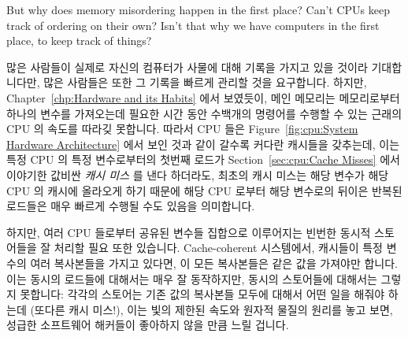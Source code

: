 But why does memory misordering happen in the first place?
Can't CPUs keep track of ordering on their own?
Isn't that why we have computers in the first place, to keep track of things?
\fi

많은 사람들이 실제로 자신의 컴퓨터가 사물에 대해 기록을 가지고 있을 것이라
기대합니다만, 많은 사람들은 또한 그 기록을 빠르게 관리할 것을 요구합니다.
하지만, Chapter~\ref{chp:Hardware and its Habits} 에서 보였듯이, 메인 메모리는
메모리로부터 하나의 변수를 가져오는데 필요한 시간 동안 수백개의 명령어를 수행할
수 있는 근래의 CPU 의 속도를 따라깆 못합니다.
따라서 CPU 들은
Figure~\ref{fig:cpu:System Hardware Architecture} 에서 보인 것과 같이
갈수록 커다란 캐시들을 갖추는데, 이는 특정 CPU 의 특정 변수로부터의 첫번째
로드가
Section~\ref{sec:cpu:Cache Misses} 에서 이야기한 값비싼 \emph{캐시 미스} 를
낸다 하더라도, 최초의 캐시 미스는 해당 변수가 해당 CPU 의 캐시에 올라오게 하기
때문에 해당 CPU 로부터 해당 변수로의 뒤이은 반복된 로드들은 매우 빠르게
수행될 수도 있음을 의미합니다.

하지만, 여러 CPU 들로부터 공유된 변수들 집합으로 이루어지는 빈번한 동시적
스토어들을 잘 처리할 필요 또한 있습니다.
Cache-coherent 시스템에서, 캐시들이 특정 변수의 여러 복사본들을 가지고 있다면,
이 모든 복사본들은 같은 값을 가져야만 합니다.
이는 동시의 로드들에 대해서는 매우 잘 동작하지만, 동시의 스토어들에 대해서는
그렇지 못합니다:  각각의 스토어는 기존 값의 복사본들 모두에 대해서 어떤 일을
해줘야 하는데 (또다른 캐시 미스!), 이는 빛의 제한된 속도와 원자적 물질의 원리를
놓고 보면, 성급한 소프트웨어 해커들이 좋아하지 않을 만큼 느릴 겁니다.

